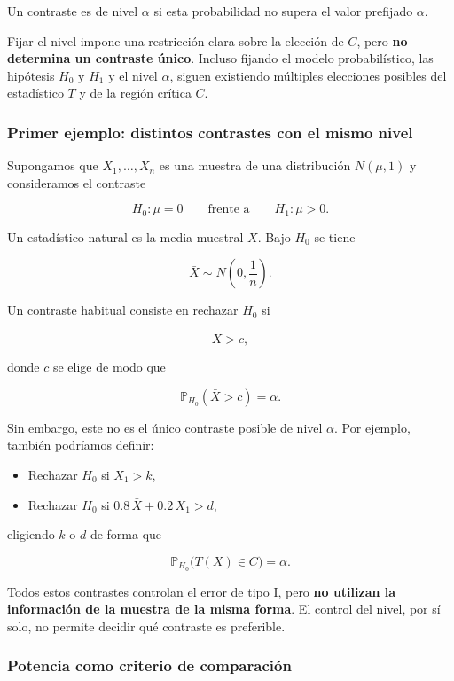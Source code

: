 \documentclass[
]{article}
\providecommand{\tightlist}{%
  \setlength{\itemsep}{0pt}\setlength{\parskip}{0pt}}
\begin{document}
Un contraste es de nivel \(\alpha\) si esta probabilidad no supera el valor prefijado \(\alpha\).

Fijar el nivel impone una restricción clara sobre la elección de \(C\), pero \textbf{no determina un contraste único}. Incluso fijando el modelo probabilístico, las hipótesis \(H_0\) y \(H_1\) y el nivel \(\alpha\), siguen existiendo múltiples elecciones posibles del estadístico \(T\) y de la región crítica \(C\).

\subsubsection{Primer ejemplo: distintos contrastes con el mismo nivel}\label{primer-ejemplo-distintos-contrastes-con-el-mismo-nivel}

Supongamos que \(X_1,\dots,X_n\) es una muestra de una distribución \(N(\mu,1)\) y consideramos el contraste

\[
H_0:\mu=0
\qquad \text{frente a} \qquad
H_1:\mu>0.
\]

Un estadístico natural es la media muestral \(\bar X\). Bajo \(H_0\) se tiene

\[
\bar X\sim N\!\left(0,\frac{1}{n}\right).
\]

Un contraste habitual consiste en rechazar \(H_0\) si

\[
\bar X>c,
\]

donde \(c\) se elige de modo que

\[
\mathbb{P}_{H_0}(\bar X>c)=\alpha.
\]

Sin embargo, este no es el único contraste posible de nivel \(\alpha\). Por ejemplo, también podríamos definir:

\begin{itemize}
\tightlist
\item
  Rechazar \(H_0\) si \(X_1>k\),
\item
  Rechazar \(H_0\) si \(0.8\,\bar X+0.2\,X_1>d\),
\end{itemize}

eligiendo \(k\) o \(d\) de forma que

\[
\mathbb{P}_{H_0}\bigl(T(X)\in C\bigr)=\alpha.
\]

Todos estos contrastes controlan el error de tipo I, pero \textbf{no utilizan la información de la muestra de la misma forma}. El control del nivel, por sí solo, no permite decidir qué contraste es preferible.

\subsubsection{Potencia como criterio de comparación}\label{potencia-como-criterio-de-comparaciuxf3n}
\end{document}
